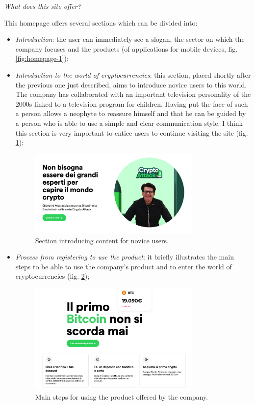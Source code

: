 \centerline{\textit{What does this site offer?}}
This homepage offers several sections which can be divided into:
\begin{itemize}
  \item \textit{Introduction}: the user can immediately see a slogan, the 
  sector on which the company focuses and the products (of applications for 
  mobile devices, fig. \ref{fig:homepage-1});

  \item \textit{Introduction to the world of cryptocurrencies}: this 
  section, placed shortly after the previous one just described, aims to 
  introduce novice users to this world. The company has collaborated with 
  an important television personality of the 2000s linked to a television 
  program for children. Having put the face of such a person allows a 
  neophyte to reassure himself and that he can be guided by a person who is 
  able to use a simple and clear communication style. I think this section 
  is very important to entice users to continue visiting the site 
  (fig. \ref{fig:introduction-1});

  \begin{figure}[H]
    \centering
    \includegraphics[width=0.80\textwidth]{res/images/introduction-1.png}
    \caption{Section introducing content for novice users.}
    \label{fig:introduction-1}
  \end{figure}

  \item \textit{Process from registering to use the product}: it briefly 
  illustrates the main steps to be able to use the company's product and to 
  enter the world of cryptocurrencies (fig. \ref{fig:registration-process});

  \begin{figure}[H]
    \centering
    \includegraphics[width=0.80\textwidth]{res/images/registration-process.png}
    \caption{Main steps for using the product offered by the company.}
    \label{fig:registration-process}
  \end{figure}


\end{itemize}
